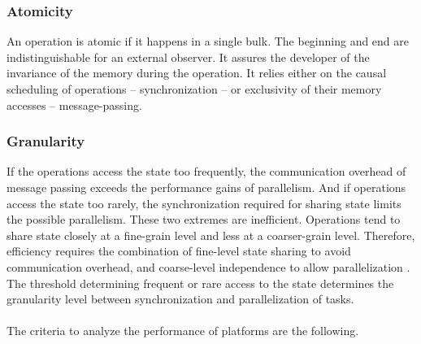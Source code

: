 \subsubsection{Atomicity}

An operation is atomic if it happens in a single bulk.
The beginning and end are indistinguishable for an external observer.
It assures the developer of the invariance of the memory during the operation.
It relies either on the causal scheduling of operations -- synchronization -- or exclusivity of their memory accesses -- message-passing.

\subsubsection{Granularity}

If the operations access the state too frequently, the communication overhead of message passing exceeds the performance gains of parallelism.
And if operations access the state too rarely, the synchronization required for sharing state limits the possible parallelism.
These two extremes are inefficient.
Operations tend to share state closely at a fine-grain level and less at a coarser-grain level.
Therefore, efficiency requires the combination of fine-level state sharing to avoid communication overhead, and coarse-level independence to allow parallelization \cite{Gustafson1988,Gunther1996,Nelson1996,Gunther2002}.
The threshold determining frequent or rare access to the state determines the granularity level between synchronization and parallelization of tasks.

\paragraph{}

The criteria to analyze the performance of platforms are the following.

